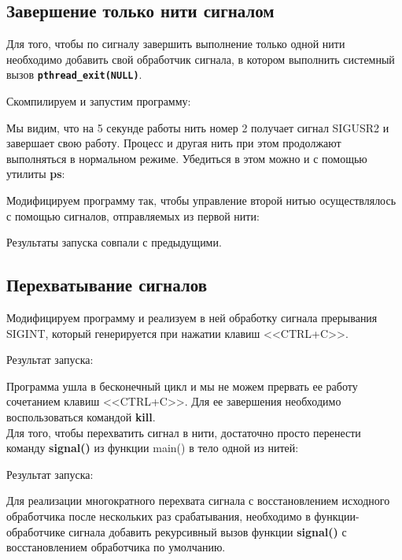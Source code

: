 \documentclass[a4paper]{article}
\begin{document}
	\subsection{Завершение только нити сигналом}
 	Для того, чтобы по сигналу завершить выполнение только одной нити необходимо добавить свой обработчик сигнала, в котором выполнить системный вызов \textbf{\texttt{pthread\_exit(NULL)}}.
	
	
	Скомпилируем и запустим программу:	
	
	
	Мы видим, что на 5 секунде работы нить номер 2 получает сигнал SIGUSR2 и завершает свою работу. Процесс и другая нить при этом продолжают выполняться в нормальном режиме. Убедиться в этом можно и с помощью утилиты \textbf{ps}:
	
	
	Модифицируем программу так, чтобы управление второй нитью осуществлялось с помощью сигналов, отправляемых из первой нити:
	

	
	Результаты запуска совпали с предыдущими.

	\subsection{Перехватывание сигналов}
	Модифицируем программу и реализуем в ней обработку сигнала прерывания SIGINT, который генерируется при нажатии клавиш <<CTRL+C>>.
	

	
	Результат запуска:
	
	
	Программа ушла в бесконечный цикл и мы не можем прервать ее работу сочетанием клавиш <<CTRL+C>>. Для ее завершения необходимо воспользоваться командой \textbf{kill}.\\

	Для того, чтобы перехватить сигнал в нити, достаточно просто перенести команду \textbf{signal()} из функции main() в тело одной из нитей:
	
	

	Результат запуска:
	
	
	Для реализации многократного перехвата сигнала с восстановлением исходного обработчика после нескольких раз срабатывания, необходимо в функции-обработчике сигнала добавить рекурсивный вызов функции \textbf{signal()} с восстановлением обработчика по умолчанию.
	
	
\end{document}
